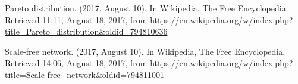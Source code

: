 \documentclass[12pt,fleqn]{article}
\begin{document}
\begin{thebibliography}{99}
Pareto distribution. (2017, August 10). In Wikipedia, The Free Encyclopedia. Retrieved 11:11, August 18, 2017, from \url{https://en.wikipedia.org/w/index.php?title=Pareto_distribution&oldid=794810636}

Scale-free network. (2017, August 10). In Wikipedia, The Free Encyclopedia. Retrieved
14:06, August 18, 2017, from \url{https://en.wikipedia.org/w/index.php?title=Scale-free_network&oldid=794811001}
\end{thebibliography}





\end{document}
